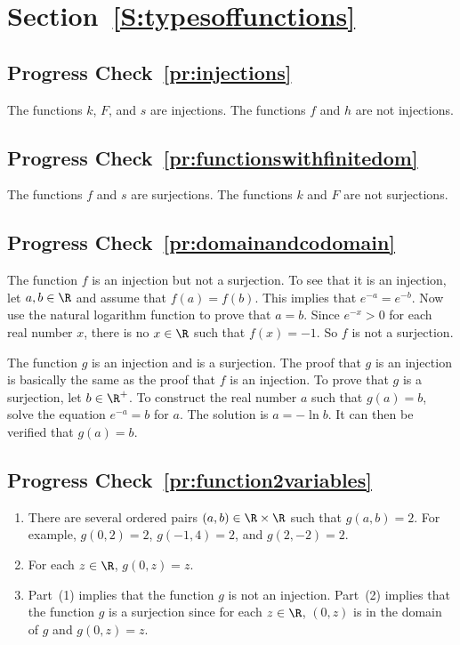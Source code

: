 \section*{Section~\ref{S:typesoffunctions}}

\subsection*{Progress Check~\ref{pr:injections}}
The functions $k$, $F$, and $s$ are injections.  The functions $f$ and $h$ are not injections.


\subsection*{Progress Check~\ref{pr:functionswithfinitedom}}
The functions $f$ and $s$ are surjections.  The functions $k$ and $F$ are not surjections.


\subsection*{Progress Check~\ref{pr:domainandcodomain}}
The function $f$ is an injection but not a surjection.  To see that it is an injection, let  $a, b \in \R$ and assume that $f(a) = f(b)$.  This implies that $e^{-a} = e^{-b}$. Now use the natural logarithm function to prove that $a = b$.  Since 
$e^{-x} > 0$ for each real number $x$, there is no $x \in \R$ such that $f(x) = -1$.  So $f$ is not a surjection.

\newpar
The function $g$ is an injection and is a surjection.  The proof that $g$ is an injection is basically the same as the proof that $f$ is an injection.  To prove that $g$ is a surjection, let $b \in \R^+$.  To construct the real number $a$ such that 
$g(a) = b$, solve the equation $e^{-a} = b$ for $a$.  The solution is $a = -\ln b$.  It can then be verified that 
$g(a) = b$.



\subsection*{Progress Check~\ref{pr:function2variables}}
\begin{enumerate}
  \item There are several ordered pairs $(a, b) \in \R \times \R$ such that $g(a, b) = 2$.  For example, $g(0, 2) = 2$, $g(-1, 4) = 2$, and $g(2, -2) = 2$.
  \item For each $z \in \R$, $g(0, z) = z$.
  \item Part~(1) implies that the function $g$ is not an injection.  Part~(2) implies that the function $g$ is a surjection since for each $z \in \R$, $(0, z)$ is in the domain of $g$ and $g(0, z) = z$.
\end{enumerate}

